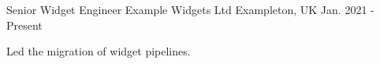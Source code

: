 \begin{cventries}
  \cventry
    {Senior Widget Engineer}
    {Example Widgets Ltd}
    {Exampleton, UK}
    {Jan. 2021 - Present}
    {
      \begin{cvitems}
        \item {Led the migration of widget pipelines.}
      \end{cvitems}
    }
\end{cventries}
